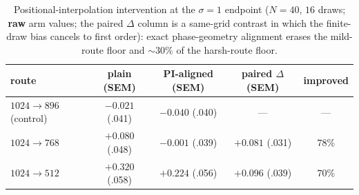 \begin{table}[h]
\caption{Positional-interpolation intervention at the $\sigma{=}1$
endpoint ($N{=}40$, $16$ draws; \textbf{raw} arm values; the paired
$\Delta$ column is a same-grid contrast in which the finite-draw bias
cancels to first order): exact phase-geometry alignment erases the
mild-route floor and ${\sim}30\%$ of the harsh-route floor.}
\label{tab:pi}
\centering
\small
\begin{tabular}{lcccc}
\toprule
route & plain (SEM) & PI-aligned (SEM) & paired $\Delta$ (SEM) & improved \\
\midrule
$1024{\to}896$ (control) & $-0.021$ (.041) & $-0.040$ (.040) & --- & --- \\
$1024{\to}768$ & $+0.080$ (.048) & $-0.001$ (.039) & $+0.081$ (.031) & $78\%$ \\
$1024{\to}512$ & $+0.320$ (.058) & $+0.224$ (.056) & $+0.096$ (.039) & $70\%$ \\
\bottomrule
\end{tabular}
\end{table}

